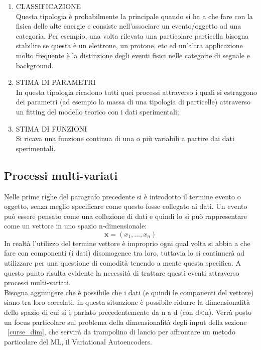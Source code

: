	\begin{enumerate}
		\item CLASSIFICAZIONE \\
			Questa tipologia è probabilmente la principale quando si ha a che fare con la fisica delle alte energie e consiste nell'associare un evento/oggetto  ad una categoria. Per esempio, una volta rilevata una particolare particella bisogna stabilire se questa è un elettrone, un protone, etc ed un'altra applicazione molto frequente è la distinzione degli eventi fisici nelle categorie di segnale e background.
  
		\item STIMA DI PARAMETRI \\
			In questa tipologia ricadono tutti quei processi attraverso i quali si estraggono dei parametri (ad esempio la massa di una tipologia di particelle) attraverso un fitting del modello teorico con i dati sperimentali;
		\item STIMA DI FUNZIONI \\
			Si ricava una funzione continua di una o più variabili a partire dai dati sperimentali.
	\end{enumerate}

\subsection{Processi multi-variati}
\label{subsec:processi multi-variati}

	Nelle prime righe del paragrafo precedente si è introdotto il termine evento o oggetto, senza meglio specificare come questo fosse collegato ai dati. Un evento può essere pensato come una collezione di dati e quindi lo si può rappresentare come un vettore in uno spazio n-dimensionale: 
	\begin{equation}
		\textbf{x} = (x_{1},...,x_{n})
	\end{equation}
	In realtà l'utilizzo del termine vettore è improprio ogni qual volta si abbia a che fare con componenti (i dati) disomogenee tra loro, tuttavia lo si continuerà ad utilizzare per una questione di comodità tenendo a mente questa specifica. A questo punto risulta evidente la necessità di trattare questi eventi attraverso processi multi-variati.\\
	Bisogna aggiungere che è possibile che i dati (e quindi le componenti del vettore) siano tra loro correlati: in questa situazione è possibile ridurre la dimensionalità dello spazio di cui si è parlato precedentemente da n a d (con d<n). Verrà posto un focus particolare sul problema della dimensionalità degli input della sezione ~\ref{curse_dim}, che servirà da trampolino di lancio per affrontare un metodo particolare del ML, il Variational Autoencoders. 
 
